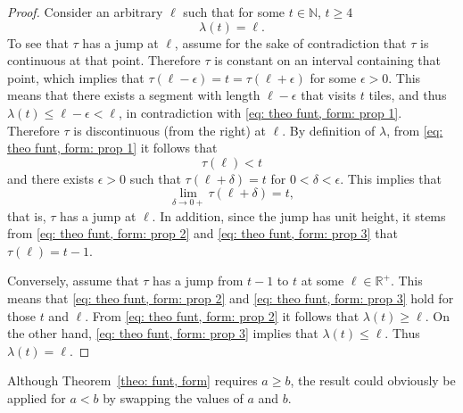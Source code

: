 \documentclass[12pt, a4paper]{article}
\newcommand{\funt}{\tau} %
\newcommand{\funl}{\lambda} %
\newcommand{\len}{\ell} %
\newcommand{\tiles}{t} %
\begin{document}
\begin{proof}
Consider an arbitrary $\len$ such that for some $\tiles \in \mathbb N$, $\tiles \geq 4$
\begin{equation}
\label{eq: theo funt, form: prop 1}
\funl(\tiles)=\len.
\end{equation}
To see that $\funt$ has a jump at $\len$, assume for the sake of contradiction that $\funt$ is continuous at that point. Therefore $\funt$ is constant on an interval containing that point, which implies that $\funt(\len-\epsilon) = \tiles = \funt(\len+\epsilon)$ for some $\epsilon > 0$. This means that there exists a segment with length $\len-\epsilon$ that visits $\tiles$ tiles, and thus $\funl(\tiles) \leq \len-\epsilon < \len$, in contradiction with \eqref{eq: theo funt, form: prop 1}. Therefore $\funt$ is discontinuous (from the right) at $\len$. By definition of $\funl$, from \eqref{eq: theo funt, form: prop 1} it follows that
\begin{equation}
\label{eq: theo funt, form: prop 2}
\funt(\len) < \tiles
\end{equation}
and there exists $\epsilon > 0$ such that $\funt(\len+\delta) = \tiles$ for $0 < \delta < \epsilon$. This implies that
\begin{equation}
\label{eq: theo funt, form: prop 3}
\lim_{\delta \rightarrow 0+} \funt(\len+\delta) = \tiles,
\end{equation}
that is, $\funt$ has a jump at $\len$. In addition, since the jump has unit height, it stems from \eqref{eq: theo funt, form: prop 2} and \eqref{eq: theo funt, form: prop 3}  that $\funt(\len) = \tiles-1$.

Conversely, assume that $\funt$ has a jump from $\tiles-1$ to $\tiles$ at some $\len \in \mathbb R^+$. This means that \eqref{eq: theo funt, form: prop 2} and \eqref{eq: theo funt, form: prop 3} hold for those $\tiles$ and $\len$. From \eqref{eq: theo funt, form: prop 2} it follows that  $\funl(\tiles) \geq \len$. On the other hand, \eqref{eq: theo funt, form: prop 3} implies that $\funl(\tiles) \leq \len$. Thus $\funl(\tiles)=\len$.
\end{proof}

Although Theorem~\ref{theo: funt, form} requires $a \geq b$, the result could obviously be applied for $a < b$ by swapping the values of $a$ and $b$.
\end{document}
